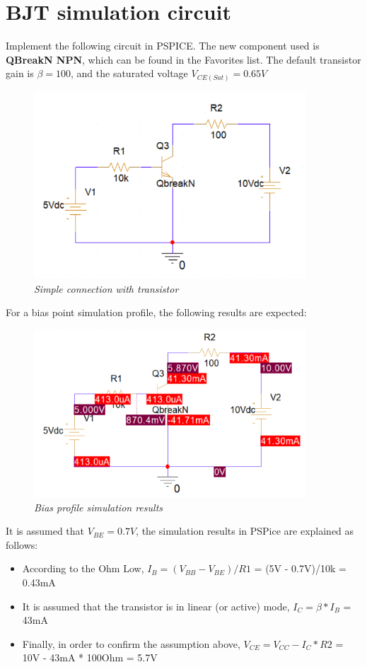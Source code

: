\newpage
\section{BJT simulation circuit}
Implement the following circuit in PSPICE. The new component used is \textbf{QBreakN NPN}, which can be found in the Favorites list. The default transistor gain is $\beta = 100$, and the saturated voltage $V_{CE(Sat)} = 0.65V$

\begin{figure}[!htp]
    \centering
    \includegraphics[width=4in]{source/picture/bai_3/manual_pic1.PNG}
    \caption{\textit{Simple connection with transistor}}
    \label{bai3_manual_1}
\end{figure}

For a bias point simulation profile, the following results are expected: 

\begin{figure}[!htp]
    \centering
    \includegraphics[width=4in]{source/picture/bai_3/manual_pic2.PNG}
    \caption{\textit{Bias profile simulation results}}
    \label{bai3_manual_2}
\end{figure}

It is assumed that $V_{BE} = 0.7V$, the simulation results in PSPice are explained as follows:
\begin{itemize}
    \item According to the Ohm Low, $I_B = (V_{BB} - V_{BE})/R1$ = (5V - 0.7V)/10k = 0.43mA
    \item It is assumed that the transistor is in linear (or active) mode, $I_C = \beta * I_B$ = 43mA
    \item Finally, in order to confirm the assumption above, $V_{CE} = V_{CC} - I_C*R2$ = 10V - 43mA * 100Ohm = 5.7V
\end{itemize}

